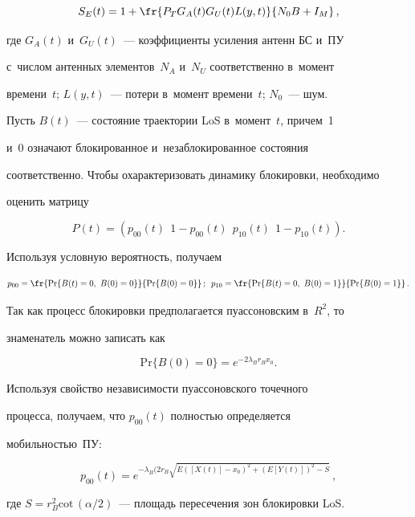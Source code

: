 $$


S_E(t)=  1+\fr{P_T G_A(t) G_U(t) L(y,t)}{N_0B+I_M}\,,


$$


где $G_A(t)$ и~$G_U(t)$~--- коэффициенты усиления антенн БС и~ПУ 


с~чис\-лом антенных элементов~$N_A$ и~$N_U$ соответственно в~момент 


времени~$t$; $L(y,t)$~--- потери в~момент времени~$t$; $N_0$~--- шум.


     


     Пусть $B(t)$~--- состояние траектории LoS в~момент~$t$, причем~1 


и~0 означают блокированное и~незаблокированное состояния 


соответственно. Чтобы охарактеризовать динамику блокировки, необходимо 


оценить матрицу


     $$


     P(t)= \left( p_{00}(t)\ \  1 - p_{00}(t)\ \ p_{10}(t)\ \ 1- p_{10}(t)\right).


     $$


Используя условную вероятность, получаем


$$


p_{00}= \fr{\mathrm{Pr}\{B(t)=0,\ B(0)=0\}}{\mathrm{Pr}\{B(0)=0\}}\,;\enskip 


p_{10}= \fr{\mathrm{Pr}\{B(t)=0,\ B(0)=1\}}{\mathrm{Pr}\{B(0)=1\}}\,.


$$


Так как процесс блокировки предполагается пуассоновским в~$R^2$, то 


знаменатель можно записать как


$$


\mathrm{Pr}\{B(0)=0\} =e^{-2\lambda_B r_B x_0}.


$$


     


     Используя свойство независимости пуассоновского точечного 


процесса, получаем, что $p_{00}(t)$ полностью определяется 


мобильностью~ПУ:


     $$


     p_{00}(t)= e^{-\lambda_B(2r_B\sqrt{E([X(t)]-x_0)^2+(E[Y(t)])^2-S}}\,,


     $$


где $S=r_B^2 \mathrm{cot}\,(\alpha/2)$~--- площадь пересечения зон блокировки LoS. 





